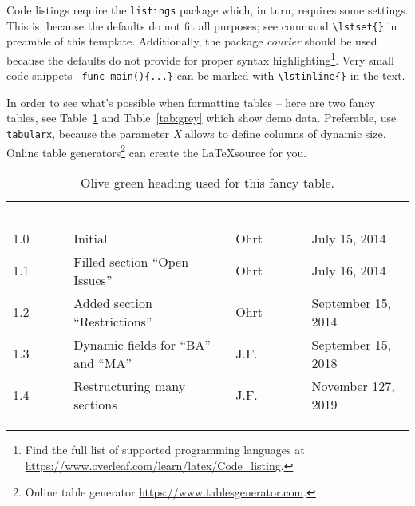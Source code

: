 Code listings require the \verb+listings+ package which, in turn, 
requires some settings. This is, because the defaults do not fit all
purposes; see command \verb+\lstset{}+ in preamble of this template. 
Additionally, the package \textit{courier} should be used because the
defaults do not provide for proper syntax highlighting\footnote{
Find the full list of supported programming languages at 
\url{https://www.overleaf.com/learn/latex/Code_listing}.
}. Very small code snippets \lstinline$ func main(){...}$ can be marked with \verb+\lstinline{}+ in the text.



In order to see what's possible when formatting tables -- here are two fancy
tables, see Table~\ref{tab:olive} and Table~\ref{tab:grey} which show 
demo data. Preferable, use  \verb+tabularx+, because the parameter \emph{X} 
allows to define columns of dynamic size. Online table generators\footnote{Online table generator \url{https://www.tablesgenerator.com}.} can create the \LaTeX source for you.

\begin{center}
  \begin{table}[tp]
    \begin{tabularx}{\textwidth}{|l|l|p{}|X|}\hline
      \rowcolor{olivegreen30}
      \textcolor{white}{\textbf{Version}}
         &\textcolor{white}{\textbf{Description}}  
           &  \textcolor{white}{\textbf{Author(s)}}  
             &\textcolor{white}{\textbf{Date}}\\
      \hline
      1.0  
        & Initial  	  	
          & Ohrt  	  	  
            & July 15, 2014\\
      \hline
      1.1  
        & Filled section ``Open Issues''  
          & Ohrt  	  	  
            & July 16, 2014\\
      \hline
      1.2  
        & Added section ``Restrictions''  
          & Ohrt  	  	  
            & September 15, 2014\\
      \hline
      1.3  
        & Dynamic fields for ``BA'' and ``MA'' 
          & J.F.  	  	  
            & September 15, 2018\\
      \hline    
      1.4  
        & Restructuring many sections 
          & J.F.  	  	  
            & November 127, 2019\\
      \hline       
      \end{tabularx}
    \caption[Fancy Table]{Olive green heading used for this fancy table.}
    \label{tab:olive}
  \end{table}
\end{center} 
  
